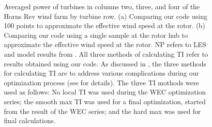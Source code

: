 \documentclass[conf]{new-aiaa}
\begin{document}
\begin{figure}[htbp!]
	\centering
	\caption{Averaged power of turbines in columns two, three, and four of the Horns Rev wind farm by turbine row. (a) Comparing our code using 100 points to approximate the effective wind speed at the rotor. (b) Comparing our code using a single sample at the rotor hub to approximate the effective wind speed at the rotor. NP refers to LES and model results from \cite{niayifar2016}. All three methods of calculating TI refer to results obtained using our code. As discussed in , the three methods for calculating TI are to address various complications during our optimization process (see  for details). The three TI mothods were used as follows: No local TI was used during the WEC optimization series; the smooth max TI was used for a final optimization, started from the result of the WEC series; and the hard max was used for final calculations.}
	\label{fig:power_line}
\end{figure}
\end{document}
